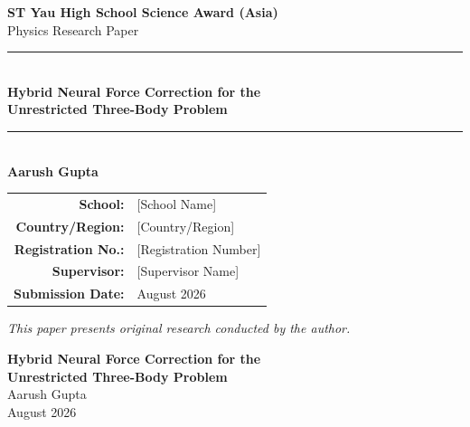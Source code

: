 \documentclass[12pt]{article}
\begin{document}
\onehalfspacing   %

\begin{titlepage}
\thispagestyle{empty}
\centering
\vspace*{1cm}

{\Large \textbf{ST Yau High School Science Award (Asia)}}\\[0.4cm]
{\large Physics Research Paper}\\[2cm]

\rule{\linewidth}{1pt}\\[0.5cm]
{\LARGE\bfseries Hybrid Neural Force Correction for the\\[0.3cm]
Unrestricted Three-Body Problem}\\[0.5cm]
\rule{\linewidth}{1pt}\\[2cm]

{\large\bfseries Aarush Gupta}\\[1cm]

\begin{tabular}{rl}
  \textbf{School:}             & [School Name] \\[0.4cm]
  \textbf{Country/Region:}     & [Country/Region] \\[0.4cm]
  \textbf{Registration No.:}   & [Registration Number] \\[0.4cm]
  \textbf{Supervisor:}         & [Supervisor Name] \\[0.4cm]
  \textbf{Submission Date:}    & August 2026 \\
\end{tabular}

\vfill
{\small \textit{This paper presents original research conducted by the author.}}
\end{titlepage}

\newpage
\thispagestyle{empty}
\setcounter{page}{1}

\begin{center}
  {\LARGE\bfseries Hybrid Neural Force Correction for the\\
  Unrestricted Three-Body Problem}\\[0.8cm]
  {\large Aarush Gupta}\\[0.3cm]
  {\normalsize August 2026}
\end{center}
\end{document}
